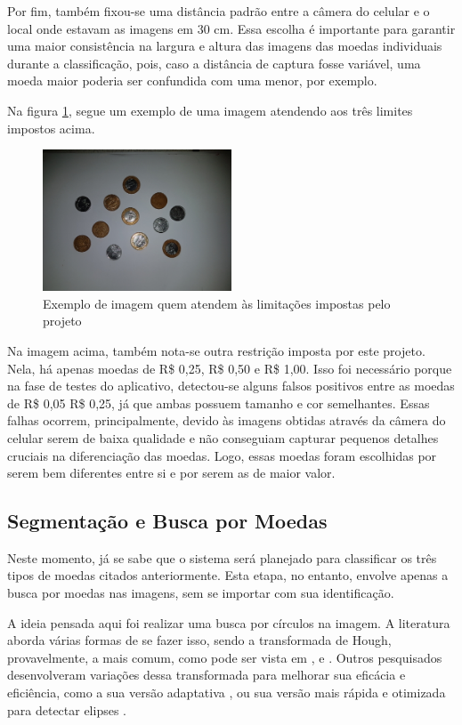 \documentclass[10pt,journal,compsoc]{IEEEtran}
\begin{document}
Por fim, também fixou-se uma distância padrão entre a câmera do celular e o local onde estavam as imagens em 30 cm. Essa escolha é importante para garantir uma maior consistência na largura e altura das imagens das moedas individuais durante a classificação, pois, caso a distância de captura fosse variável, uma moeda maior poderia ser confundida com uma menor, por exemplo.

Na figura \ref{fig:criterios}, segue um exemplo de uma imagem atendendo aos três limites impostos acima.

\begin{figure}[ht]
\centering
\caption{Exemplo de imagem quem atendem às limitações impostas pelo projeto}
\label{fig:criterios}
\includegraphics[width=0.5\textwidth]{completa4.jpg}
\end{figure}

Na imagem acima, também nota-se outra restrição imposta por este projeto. Nela, há apenas moedas de R\$ 0,25, R\$ 0,50 e R\$ 1,00. Isso foi necessário porque na fase de testes do aplicativo, detectou-se alguns falsos positivos entre as moedas de R\$ 0,05 R\$ 0,25, já que ambas possuem tamanho e cor semelhantes. Essas falhas ocorrem, principalmente, devido às imagens obtidas através da câmera do celular serem de baixa qualidade e não conseguiam capturar pequenos detalhes cruciais na diferenciação das moedas. Logo, essas moedas foram escolhidas por serem bem diferentes entre si e por serem as de maior valor.


\subsection{Segmentação e Busca por Moedas}
\label{sec:metodologia:rna}

Neste momento, já se sabe que o sistema será planejado para classificar os três tipos de moedas citados anteriormente. Esta etapa, no entanto, envolve apenas a busca por moedas nas imagens, sem se importar com sua identificação.

A ideia pensada aqui foi realizar uma busca por círculos na imagem. A literatura aborda várias formas de se fazer isso, sendo a transformada de Hough, provavelmente, a mais comum, como pode ser vista em \cite{ioannou1999circle}, \cite{kerbyson1995circle} e \cite{yuen1990comparative}. Outros pesquisados desenvolveram variações dessa transformada para melhorar sua eficácia e eficiência, como a sua versão adaptativa \cite{illingworth1987adaptive}, ou sua versão mais rápida e otimizada para detectar elipses \cite{guil1997lower}.
\end{document}
